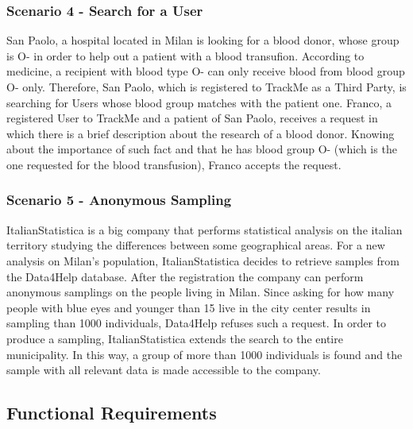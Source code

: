 \documentclass[12pt,a4paper]{article}
\begin{document}
	\subsubsection*{Scenario 4 - Search for a User}
		San Paolo, a hospital located in Milan is looking for a blood donor, whose  group is O- in order to help out a patient with a blood transufion. According to medicine, a recipient with blood type O- can only receive blood from blood group O- only. Therefore, San Paolo, which is registered to TrackMe as a Third Party, is searching for Users whose blood group matches with the patient one.
		Franco, a registered User to TrackMe and a patient of San Paolo, receives a request in which there is a brief description about the research of a blood donor. Knowing about the importance of such fact and that he has blood group O- (which is the one requested for the blood transfusion), Franco accepts the request.

	\subsubsection*{Scenario 5 - Anonymous Sampling}
		ItalianStatistica is a big company that performs statistical analysis on the italian territory studying the differences between some geographical areas. For a new analysis on Milan's population, ItalianStatistica decides to retrieve samples from the Data4Help database. After the registration the company can perform anonymous samplings on the people living in Milan. Since asking for how many people with blue eyes and younger than 15 live in the city center results in sampling than 1000 individuals, Data4Help refuses such a request. In order to produce a sampling, ItalianStatistica extends the search to the entire municipality. In this way, a group of more than 1000 individuals is found and the sample with all relevant data is made accessible to the company.

	\newpage

	\subsection{Functional Requirements}
\end{document}
